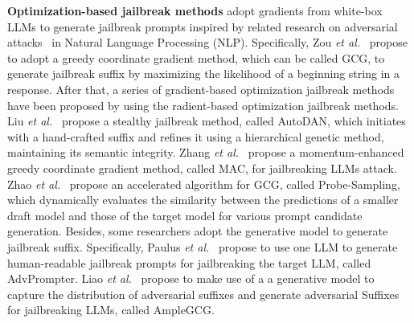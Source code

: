 \par \textbf{Optimization-based jailbreak methods} adopt gradients from white-box LLMs to generate jailbreak prompts inspired by related research on adversarial attacks~\cite{qiu2022adversarial,goyal2023survey,nakamura2023logicattack,yang2024cheating} in Natural Language Processing (NLP). Specifically, Zou \textit{et al.}~\cite{zou2023universal} propose to adopt a greedy coordinate gradient method, which can be called GCG, to generate jailbreak suffix by maximizing the likelihood of a beginning string in a response. After that, a series of gradient-based optimization jailbreak methods have been proposed by using the radient-based optimization jailbreak methods. Liu \textit{et al.}~\cite{liu2023autodan} propose a stealthy jailbreak method, called AutoDAN, which initiates with a hand-crafted suffix and refines it using a hierarchical genetic 
method, maintaining its semantic integrity. Zhang \textit{et al.}~\cite{zhang2024boosting} propose a momentum-enhanced greedy coordinate gradient method, called MAC, for jailbreaking LLMs attack. Zhao \textit{et al.}~\cite{zhao2024accelerating} propose an accelerated algorithm for GCG, called Probe-Sampling, which dynamically evaluates the similarity between the predictions of a smaller draft model and those of the target model for various prompt candidate generation. Besides, some researchers adopt the generative model to generate jailbreak suffix. Specifically, Paulus \textit{et al.}~\cite{paulus2024advprompter} propose to use one LLM to generate human-readable jailbreak prompts for jailbreaking the target LLM, called AdvPrompter. Liao \textit{et al.}~\cite{liao2024amplegcg} propose to make use of a a generative model to capture the distribution of adversarial suffixes and generate adversarial Suffixes for jailbreaking LLMs, called AmpleGCG. 

